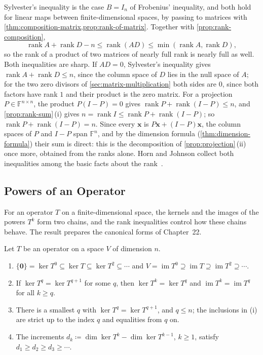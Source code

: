 Sylvester's inequality is the case $B=I_n$ of Frobenius' inequality, and both hold for linear maps between finite-dimensional spaces, by passing to matrices with \cref{thm:composition-matrix,prop:rank-of-matrix}. Together with \cref{prop:rank-composition},
\[
\operatorname{rank}A+\operatorname{rank}D-n\le\operatorname{rank}(AD)\le\min(\operatorname{rank}A,\operatorname{rank}D),
\]
so the rank of a product of two matrices of nearly full rank is nearly full as well. Both inequalities are sharp. If $AD=0$, Sylvester's inequality gives $\operatorname{rank}A+\operatorname{rank}D\le n$, since the column space of $D$ lies in the null space of $A$; for the two zero divisors of \cref{sec:matrix-multiplication} both sides are $0$, since both factors have rank $1$ and their product is the zero matrix. For a projection $P\in\mathbb F^{n\times n}$, the product $P(I-P)=0$ gives $\operatorname{rank}P+\operatorname{rank}(I-P)\le n$, and \cref{prop:rank-sum}\,(i) gives $n=\operatorname{rank}I\le\operatorname{rank}P+\operatorname{rank}(I-P)$; so $\operatorname{rank}P+\operatorname{rank}(I-P)=n$. Since every $\mathbf x$ is $P\mathbf x+(I-P)\mathbf x$, the column spaces of $P$ and $I-P$ span $\mathbb F^n$, and by the dimension formula (\cref{thm:dimension-formula}) their sum is direct: this is the decomposition of \cref{prop:projection}\,(ii) once more, obtained from the ranks alone. Horn and Johnson collect both inequalities among the basic facts about the rank~\cite[Sect.~0.4]{horn2013}.

\subsection{Powers of an Operator}

For an operator $T$ on a finite-dimensional space, the kernels and the images of the powers $T^k$ form two chains, and the rank inequalities control how these chains behave. The result prepares the canonical forms of Chapter~22.

\begin{proposition}
\label{prop:kernel-chain}
Let $T$ be an operator on a space $V$ of dimension $n$.
\begin{enumerate}
\item $\{\mathbf 0\}=\ker T^0\subseteq\ker T\subseteq\ker T^2\subseteq\cdots$ and $V=\operatorname{im}T^0\supseteq\operatorname{im}T\supseteq\operatorname{im}T^2\supseteq\cdots$.
\item If $\ker T^q=\ker T^{q+1}$ for some $q$, then $\ker T^k=\ker T^q$ and $\operatorname{im}T^k=\operatorname{im}T^q$ for all $k\ge q$.
\item There is a smallest $q$ with $\ker T^q=\ker T^{q+1}$, and $q\le n$; the inclusions in (i) are strict up to the index $q$ and equalities from $q$ on.
\item The increments $d_k\coloneqq\dim\ker T^k-\dim\ker T^{k-1}$, $k\ge1$, satisfy $d_1\ge d_2\ge d_3\ge\cdots$.
\end{enumerate}
\end{proposition}

